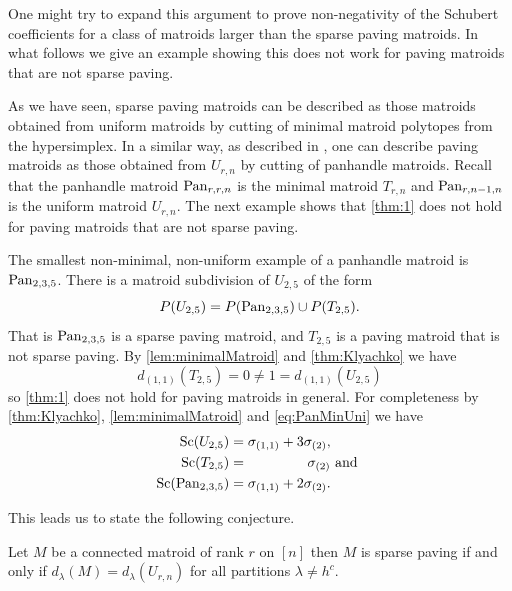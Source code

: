 One might try to expand this argument to prove non-negativity of the Schubert coefficients for a class of matroids larger than the sparse paving matroids. In what follows we give an example showing this does not work for paving matroids that are not sparse paving.

As we have seen, sparse paving matroids can be described as those matroids obtained from uniform matroids by cutting of minimal matroid polytopes from the hypersimplex. In a similar way, as described in \cite{HMMMNVYPanhandle}, one can describe paving matroids as those obtained from $U_{r,n}$ by cutting of panhandle matroids. Recall that the panhandle matroid $\operatorname{\mathrm{Pan}}_{r,r,n}$ is the minimal matroid $T_{r,n}$ and $\operatorname{\mathrm{Pan}}_{r,n-1,n}$ is the uniform matroid $U_{r,n}$. The next example shows that \cref{thm:1} does not hold for paving matroids that are not sparse paving.

\begin{example}
    The smallest non-minimal, non-uniform example of a panhandle matroid is $\operatorname{\mathrm{Pan}}_{2,3,5}$. There is a matroid subdivision of $U_{2,5}$ of the form
    \begin{equation}
        \label{eq:PanMinUni}
        P(U_{2,5}) = P(\operatorname{\mathrm{Pan}}_{2,3,5}) \cup P(T_{2,5}).
    \end{equation}
    That is $\operatorname{\mathrm{Pan}}_{2,3,5}$ is a sparse paving matroid, and $T_{2,5}$ is a paving matroid that is not sparse paving. 
    By \cref{lem:minimalMatroid} and \cref{thm:Klyachko} we have
    \begin{equation*}
        d_{(1,1)}(T_{2,5}) = 0 \neq 1 = d_{(1,1)}(U_{2,5})
    \end{equation*}
    so \cref{thm:1} does not hold for paving matroids in general. For completeness by \cref{thm:Klyachko}, \cref{lem:minimalMatroid} and \cref{eq:PanMinUni} we have
    \begin{align*}
        \operatorname{\mathrm{Sc}}(U_{2,5}) &= \sigma_{(1,1)} + 3 \sigma_{(2)}, \\
        \operatorname{\mathrm{Sc}}(T_{2,5}) &= \hspace{1.5cm} \sigma_{(2)} \text{ and }\\
        \operatorname{\mathrm{Sc}}(\operatorname{\mathrm{Pan}}_{2,3,5}) &= \sigma_{(1,1)} + 2\sigma_{(2)}.
    \end{align*}
\end{example}
This leads us to state the following conjecture.
\begin{conj}
    Let $M$ be a connected matroid of rank $r$ on $[n]$ then $M$ is sparse paving if and only if $d_\lambda(M) = d_\lambda(U_{r,n})$ for all partitions $\lambda \neq h^c$.
\end{conj}
